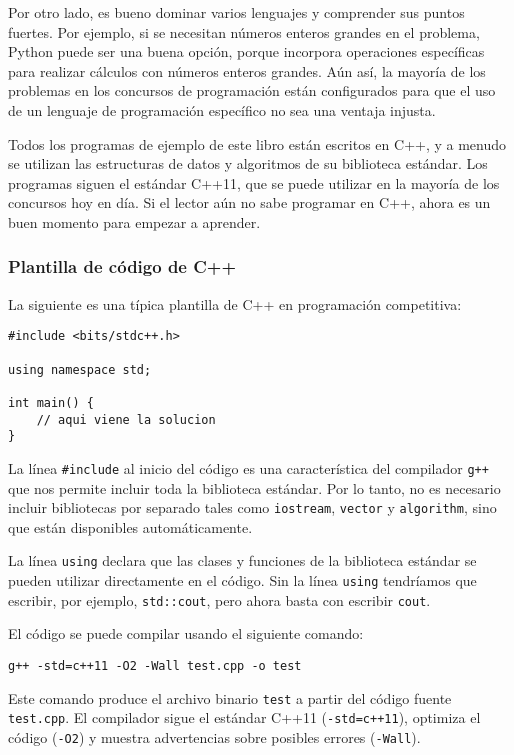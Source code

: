 Por otro lado, es bueno
dominar varios lenguajes y comprender
sus puntos fuertes.
Por ejemplo, si se necesitan números enteros grandes
en el problema,
Python puede ser una buena opción, porque
incorpora operaciones específicas para
realizar cálculos con números enteros grandes.
Aún así, la mayoría de los problemas en los concursos de programación
están configurados para que
el uso de un lenguaje de programación específico
no sea una ventaja injusta.

Todos los programas de ejemplo de este libro están escritos en C++,
y a menudo se utilizan las estructuras de datos y algoritmos 
de su biblioteca estándar.
Los programas siguen el estándar C++11,
que se puede utilizar en la mayoría de los concursos hoy en día.
Si el lector aún no sabe programar en C++,
ahora es un buen momento para empezar a aprender.

\subsubsection{Plantilla de código de C++}

La siguiente es una típica plantilla de C++
en programación competitiva:

\begin{lstlisting}
#include <bits/stdc++.h>

using namespace std;

int main() {
    // aqui viene la solucion
}
\end{lstlisting}

La línea \texttt{\#include} al inicio
del código es una característica del compilador \texttt{g++}
que nos permite incluir toda la biblioteca estándar.
Por lo tanto, no es necesario incluir bibliotecas 
por separado tales como \texttt{iostream},
\texttt{vector} y \texttt{algorithm},
sino que están disponibles automáticamente.

La línea \texttt{using} declara
que las clases y funciones
de la biblioteca estándar se pueden utilizar directamente
en el código.
Sin la línea \texttt{using} tendríamos que
escribir, por ejemplo, \texttt{std::cout},
pero ahora basta con escribir \texttt{cout}.

El código se puede compilar usando el siguiente comando:

\begin{lstlisting}
g++ -std=c++11 -O2 -Wall test.cpp -o test
\end{lstlisting}

Este comando produce el archivo binario \texttt{test}
a partir del código fuente \texttt{test.cpp}.
El compilador sigue el estándar C++11
(\texttt{-std=c++11}),
optimiza el código (\texttt{-O2})
y muestra advertencias sobre posibles errores  (\texttt{-Wall}).

